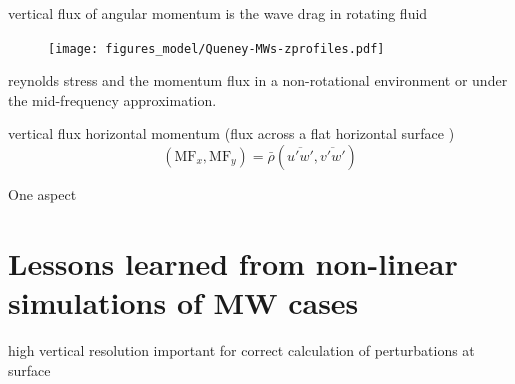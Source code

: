 vertical flux of angular momentum is the wave drag in rotating fluid

\begin{figure}[tbp]
    \centering
    \texttt{[image: figures\_model/Queney-MWs-zprofiles.pdf]}
    \caption{}
    \label{fig:Queney-MWs-zprofiles}
\end{figure}


reynolds stress and the momentum flux in a non-rotational environment or under the mid-frequency approximation.

vertical flux horizontal momentum (flux across a flat horizontal surface )
\begin{equation}
    (\mathrm{MF}_x, \mathrm{MF}_y) = \bar{\rho}  (\overbar{u'w'},\overbar{v'w'})
    \label{equ:mf}
\end{equation}

One aspect


\section*{Lessons learned from non-linear simulations of MW cases}

high vertical resolution important for correct calculation of perturbations at surface

